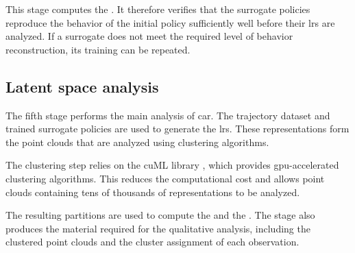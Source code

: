 This stage computes the \BehaviorReconstructionName.
It therefore verifies that the surrogate policies reproduce the behavior of the initial policy sufficiently well before their \glspl{lr} are analyzed.
If a surrogate does not meet the required level of behavior reconstruction, its training can be repeated.

\subsection{Latent space analysis}

The fifth stage performs the main analysis of \gls{car}.
The trajectory dataset and trained surrogate policies are used to generate the \glspl{lr}.
These representations form the point clouds that are analyzed using clustering algorithms.

The clustering step relies on the cuML library \parencite{raschka2020cuml}, which provides \gls{gpu}-accelerated clustering algorithms.
This reduces the computational cost and allows point clouds containing tens of thousands of representations to be analyzed.

The resulting partitions are used to compute the \ClusteringUniversalityName and the \AbstractionScoreName.
The stage also produces the material required for the qualitative analysis, including the clustered point clouds and the cluster assignment of each observation.
